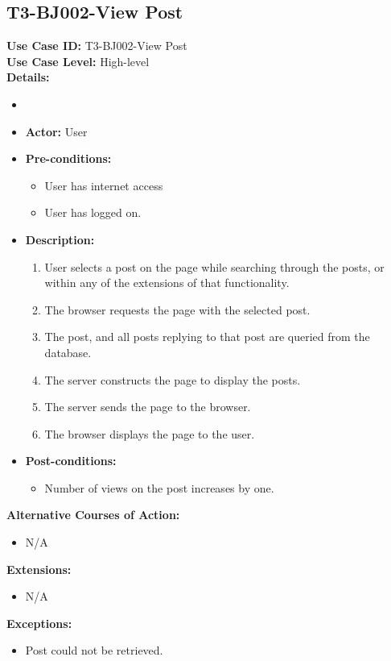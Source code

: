 \subsection{T3-BJ002-View Post}
\textbf{Use Case ID:} T3-BJ002-View Post\\
\textbf{Use Case Level:} High-level\\
\textbf{Details:}
\begin{itemize}
    \item %
    \item \textbf{Actor:} User
    \item \textbf{Pre-conditions:}
    \begin{itemize}
        \item User has internet access
        \item User has logged on.
    \end{itemize}
    \item \textbf{Description:}
    \begin{enumerate}
        \item User selects a post on the page while searching through the posts, or within any of the extensions of that functionality.
        \item The browser requests the page with the selected post.
        \item The post, and all posts replying to that post are queried from the database.
        \item The server constructs the page to display the posts.
        \item The server sends the page to the browser.
        \item The browser displays the page to the user.
    \end{enumerate}
    \item \textbf{Post-conditions:}
    \begin{itemize}
        \item Number of views on the post increases by one.
    \end{itemize}
\end{itemize}
\textbf{Alternative Courses of Action:}
\begin{itemize}
    \item N/A
\end{itemize}
\textbf{Extensions:}
\begin{itemize}
    \item N/A
\end{itemize}
\textbf{Exceptions:}
\begin{itemize}
    \item Post could not be retrieved.
\end{itemize}
